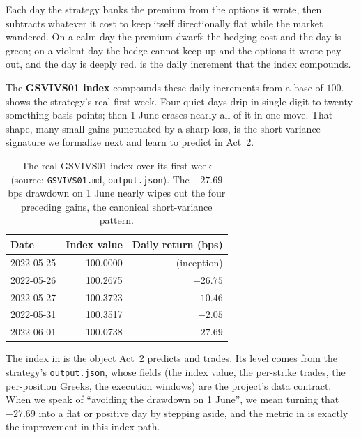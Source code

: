 \begin{intuition}
Each day the strategy banks the premium from the options it wrote, then subtracts whatever it cost to keep itself directionally flat while the market wandered. On a calm day the premium dwarfs the hedging cost and the day is green; on a violent day the hedge cannot keep up and the options it wrote pay out, and the day is deeply red.  is the daily increment that the index compounds.
\end{intuition}

The \textbf{GSVIVS01 index} compounds these daily increments from a base of $100$.  shows the strategy's real first week. Four quiet days drip in single-digit to twenty-something basis points; then 1 June erases nearly all of it in one move. That shape, many small gains punctuated by a sharp loss, is the short-variance signature we formalize next and learn to predict in Act~2.

\begin{table}[ht]
\centering
\caption{The real GSVIVS01 index over its first week (source: \texttt{GSVIVS01.md}, \texttt{output.json}). The $-27.69$ bps drawdown on 1 June nearly wipes out the four preceding gains, the canonical short-variance pattern.}
\label{tab:gsvivs:index}
\begin{tabular}{lrr}
\toprule
Date & Index value & Daily return (bps) \\
\midrule
2022-05-25 & 100.0000 & --- (inception) \\
2022-05-26 & 100.2675 & $+26.75$ \\
2022-05-27 & 100.3723 & $+10.46$ \\
2022-05-31 & 100.3517 & $-2.05$ \\
2022-06-01 & 100.0738 & $-27.69$ \\
\bottomrule
\end{tabular}
\end{table}

\begin{projectconnection}
The index in  is the object Act~2 predicts and trades. Its level comes from the strategy's \texttt{output.json}, whose fields (the index value, the per-strike trades, the per-position Greeks, the execution windows) are the project's data contract. When we speak of ``avoiding the drawdown on 1 June'', we mean turning that $-27.69$ into a flat or positive day by stepping aside, and the metric in  is exactly the improvement in this index path.
\end{projectconnection}

